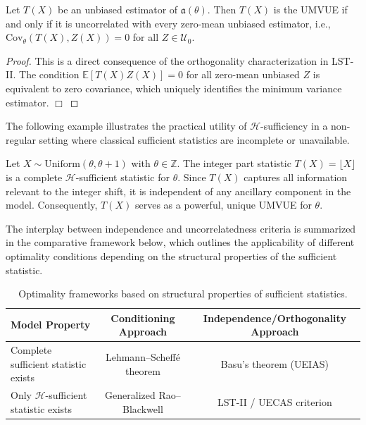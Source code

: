 \documentclass[twoside]{article}
\begin{document}
\begin{thm}\label{thm:uecas}
Let $T(X)$ be an unbiased estimator of $\mathfrak{a}(\theta)$. Then $T(X)$ is the UMVUE if and only if it is uncorrelated with every zero-mean unbiased estimator, i.e., $\mathrm{Cov}_{\theta}(T(X), Z(X)) = 0$ for all $Z \in \mathcal{U}_0$.
\end{thm}
\begin{proof}
This is a direct consequence of the orthogonality characterization in LST-II. The condition $\mathbb{E}[T(X)Z(X)] = 0$ for all zero-mean unbiased $Z$ is equivalent to zero covariance, which uniquely identifies the minimum variance estimator. \hfill $\Box$
\end{proof}

The following example illustrates the practical utility of $\mathscr{H}$-sufficiency in a non-regular setting where classical sufficient statistics are incomplete or unavailable.

\begin{eg}\label{ex:uniform}
Let $X \sim \mathrm{Uniform}(\theta, \theta+1)$ with $\theta \in \mathbb{Z}$. The integer part statistic $T(X) = \lfloor X \rfloor$ is a complete $\mathscr{H}$-sufficient statistic for $\theta$. Since $T(X)$ captures all information relevant to the integer shift, it is independent of any ancillary component in the model. Consequently, $T(X)$ serves as a powerful, unique UMVUE for $\theta$.
\end{eg}

The interplay between independence and uncorrelatedness criteria is summarized in the comparative framework below, which outlines the applicability of different optimality conditions depending on the structural properties of the sufficient statistic.

\begin{table}[htbp]
\centering
\caption{Optimality frameworks based on structural properties of sufficient statistics.}
\label{tab:comparison}
\begin{tabular}{lcc}
\toprule
\textbf{Model Property} & \textbf{Conditioning Approach} & \textbf{Independence/Orthogonality Approach} \\
\midrule
Complete sufficient statistic exists & Lehmann--Scheff\'{e} theorem & Basu's theorem (UEIAS) \\
Only $\mathscr{H}$-sufficient statistic exists & Generalized Rao--Blackwell & LST-II / UECAS criterion \\
\bottomrule
\end{tabular}
\end{table}
\end{document}
